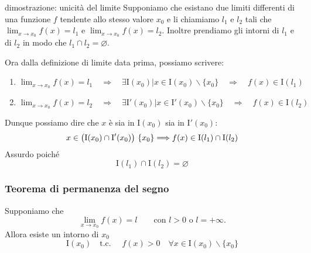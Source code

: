 \documentclass[x11names]{article}
\begin{document}
	
	\begin{es}{dimostrazione: unicità del limite} 
		Supponiamo che esistano due limiti differenti di una funzione $f$ tendente allo stesso valore $x_0$ e li chiamiamo $l_1$ e $l_2$ tali che $\lim_{x\to x_0}f\left(x\right) = l_1$ e $\lim_{ x\to x_0}f\left(x\right) = l_2$. Inoltre prendiamo gli intorni di  $l_1$ e di $l_2$ in modo che $l_1 \cap l_2 = \varnothing$.
		
		\begin{center}
			
		\end{center}
		
		
		Ora dalla definizione di limite data prima, possiamo scrivere:
		\begin{enumerate}
			\item $\lim_{x\to x_0}f\left(x\right) = l_1 \quad \Rightarrow \quad  \exists \text{I}\left(x_0\right) | x \in \text{I}\left(x_0\right) \backslash \{x_0\} \quad \Rightarrow \quad f\left(x\right) \in \text{I}\left(l_1\right)$
			\item $\lim_{x\to x_0}f\left(x\right) = l_2 \quad \Rightarrow \quad  \exists \text{I}'\left(x_0\right) | x \in \text{I}'\left(x_0\right) \backslash \{x_0\} \quad \Rightarrow \quad f\left(x\right) \in \text{I}\left(l_2\right)$
		\end{enumerate}
		Dunque possiamo dire che $x$ è sia in $\text{I}(x_0)$ sia in $\text{I}'(x_0)$:
		\[
		x \in \left(\text{I}(x_0) \cap \text{I}'(x_0)\right)\\ \left\{x_0\right\} \Longrightarrow f(x) \in \text{I}(l_1) \cap \text{I}(l_2)
		\]
		Assurdo poiché
		\[
		\text{I}(l_1) \cap \text{I}(l_2) = \varnothing
		\]
	\end{es}
	
	
	\begin{center}
		\colorbox{myred}{\begin{minipage}{5.75in}
				\begin{redes}{}
					\subsubsection{Teorema di permanenza del segno}
					Supponiamo che 
					\[
					\lim_{x \to x_0}f(x) = l \qquad \text{con } l>0 \text{ o } l = +\infty.
					\]
					Allora esiste un intorno di $x_0$
					\[
					\text{I}(x_0) \quad \text{t.c. } \quad f(x) > 0 \quad \forall x \in \text{I}(x_0) \backslash \{x_0\}
					\]
				\end{redes}
		\end{minipage}}        
	\end{center}
	
\end{document}
